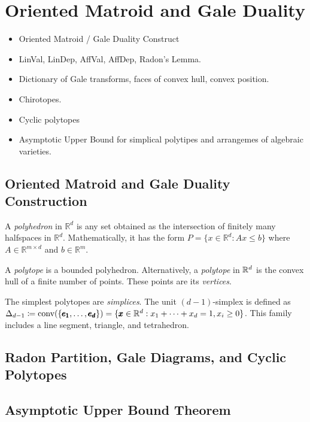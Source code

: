 \section{Oriented Matroid and Gale Duality}

\begin{itemize}
    \item Oriented Matroid / Gale Duality Construct
    \item LinVal, LinDep, AffVal, AffDep, Radon's Lemma.
    \item Dictionary of Gale transforms, faces of convex hull, convex position.
    \item Chirotopes.
    \item Cyclic polytopes
    \item Asymptotic Upper Bound for simplical polytipes and arrangemes of algebraic varieties.
\end{itemize}

\subsection{Oriented Matroid and Gale Duality Construction}

\begin{definition}[Polyhedron]
    A \textit{polyhedron} in $\mathbb{R}^d$ is any set obtained as the intersection of finitely many halfspaces in $\mathbb{R}^d$.
    Mathematically, it has the form $P = \{x \in \mathbb{R}^d: Ax \leq b \}$ where $A \in \mathbb{R}^{m\times d}$ and $b \in \mathbb{R}^m$.
\end{definition}

\begin{definition}[Polytope]
    A \textit{polytope} is a bounded polyhedron.
    Alternatively, a \textit{polytope} in $\mathbb{R}^d$ is the convex hull of a finite number of points.
    These points are its \textit{vertices}.
\end{definition}

\begin{definition}[Simplices]
    The simplest polytopes are \textit{simplices}.
    The unit $(d-1)$-simplex is defined as $\Delta_{d-1} \coloneqq \text{conv}(\{\pmb{e_1}, \dots, \pmb{e_d}\}) = \{ \pmb{x} \in \mathbb{R}^d : x_1 + \dots + x_d = 1, x_i \geq 0 \}$.
    This family includes a line segment, triangle, and tetrahedron.
\end{definition}

\subsection{Radon Partition, Gale Diagrams, and Cyclic Polytopes}

\subsection{Asymptotic Upper Bound Theorem}
